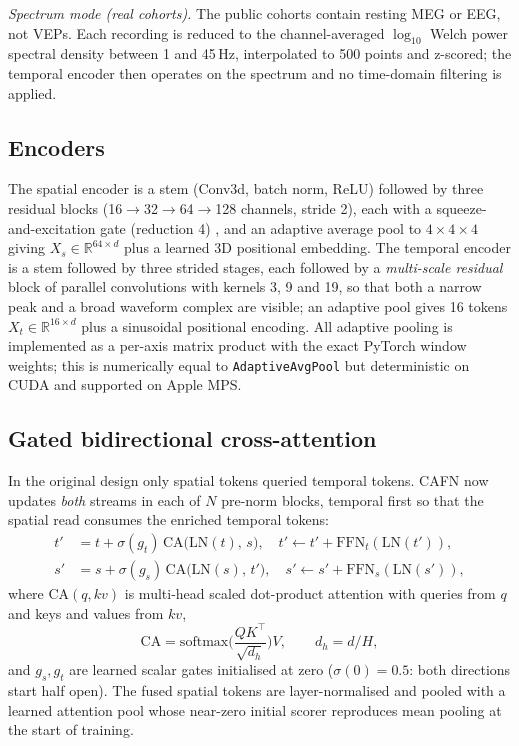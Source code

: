 \documentclass{ieeeaccessapprox}
\begin{document}
\emph{Spectrum mode (real cohorts).} The public cohorts contain resting MEG or EEG, not VEPs. Each recording is reduced to the channel-averaged $\log_{10}$ Welch power spectral density between 1 and 45\,Hz, interpolated to 500 points and z-scored; the temporal encoder then operates on the spectrum and no time-domain filtering is applied.

\subsection{Encoders}
The spatial encoder is a stem (Conv3d, batch norm, ReLU) followed by three residual blocks (16$\to$32$\to$64$\to$128 channels, stride 2), each with a squeeze-and-excitation gate (reduction 4) \cite{hu2018}, and an adaptive average pool to $4\times4\times4$ giving $X_s\in\mathbb{R}^{64\times d}$ plus a learned 3D positional embedding. The temporal encoder is a stem followed by three strided stages, each followed by a \emph{multi-scale residual} block of parallel convolutions with kernels 3, 9 and 19, so that both a narrow peak and a broad waveform complex are visible; an adaptive pool gives 16 tokens $X_t\in\mathbb{R}^{16\times d}$ plus a sinusoidal positional encoding. All adaptive pooling is implemented as a per-axis matrix product with the exact PyTorch window weights; this is numerically equal to \texttt{AdaptiveAvgPool} but deterministic on CUDA and supported on Apple MPS.

\subsection{Gated bidirectional cross-attention}
In the original design only spatial tokens queried temporal tokens. CAFN now updates \emph{both} streams in each of $N$ pre-norm blocks, temporal first so that the spatial read consumes the enriched temporal tokens:
\begin{align}
t' &= t + \sigma(g_t)\,\mathrm{CA}\big(\mathrm{LN}(t),\,s\big),\quad t'\leftarrow t'+\mathrm{FFN}_t(\mathrm{LN}(t')),\\
s' &= s + \sigma(g_s)\,\mathrm{CA}\big(\mathrm{LN}(s),\,t'\big),\quad s'\leftarrow s'+\mathrm{FFN}_s(\mathrm{LN}(s')),
\end{align}
where $\mathrm{CA}(q,kv)$ is multi-head scaled dot-product attention with queries from $q$ and keys and values from $kv$,
\begin{equation}
\mathrm{CA}=\mathrm{softmax}\!\Big(\frac{QK^{\top}}{\sqrt{d_h}}\Big)V,\qquad d_h=d/H,
\end{equation}
and $g_s,g_t$ are learned scalar gates initialised at zero ($\sigma(0)=0.5$: both directions start half open). The fused spatial tokens are layer-normalised and pooled with a learned attention pool whose near-zero initial scorer reproduces mean pooling at the start of training.
\end{document}
